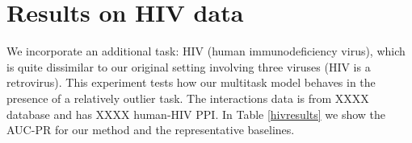 \documentclass{bioinfo}
\begin{document}
%
%
%

\section{Results on HIV data}
We incorporate an additional task: HIV (human immunodeficiency virus), which is quite dissimilar to our original setting involving three viruses (HIV is a retrovirus). This experiment tests how our multitask model behaves in the presence of a relatively outlier task. The interactions data is from XXXX database and has XXXX human-HIV PPI. In Table \ref{hivresults} we show the AUC-PR for our method and the representative baselines.
\end{document}
